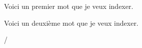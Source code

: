 \documentclass{book}
\begin{document}
\begin{pages}

\begin{Leftside}  
  \beginnumbering
  \pstart
  Voici un premier mot que je veux indexer.
  \pend
  \endnumbering
\end{Leftside}

\begin{Rightside}
  \beginnumbering
  \pstart
  \label{la}Voici un deuxième mot que je veux indexer.
  \pend
  \endnumbering
\end{Rightside}

\end{pages}

\Pages
\pageref{la}/

\printindex[mots]
\end{document}
